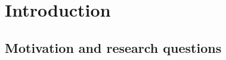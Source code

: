 
\chapter{Introduction} %

\label{Chapter1} %



\section{Motivation and research questions}
\label{researchquestions}

